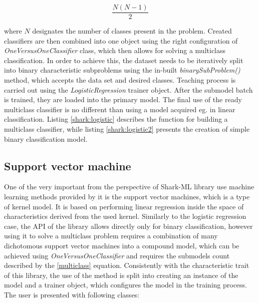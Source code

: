 \begin{equation}
	\frac{N(N-1)}{2}	
	\label{multiclass}
\end{equation}

where $N$ designates the number of classes present in the problem. Created classifiers are then combined into one object using the right configuration of \textit{OneVersusOneClassifier} class, which then allows for solving a multiclass classification. In order to achieve this, the dataset needs to be iteratively split into binary characteristic subproblems using the in-built \textit{binarySubProblem()} method, which accepts the data set and desired classes. Teaching process is carried out using the \textit{LogisticRegression} trainer object. After the submodel batch is trained, they are loaded into the primary model. The final use of the ready multiclass classifier is no different than using a model acquired eg. in linear classification. Listing \ref{shark:logistic} describes the function for building a multiclass classifier, while listing \ref{shark:logistic2} presents the creation of simple binary classification model. 

\newpage
{}


\subsection{Support vector machine}

One of the very important from the perspective of Shark-ML library use machine learning methods provided by it is the support vector machines, which is a type of kernel model. It is based on performing linear regression inside the space of characteristics derived from the used kernel. Similarly to the logistic regression case, the API of the library allows directly only for binary classification, however using it to solve a multiclass problem requires a combination of many dichotomous support vector machines into a compound model, which can be achieved using \textit{OneVersusOneClassifier} and requires the submodels count described by the \ref{multiclass} equation. Consistently with the characteristic trait of this library, the use of the method is split into creating an instance of the model and a trainer object, which configures the model in the training process. The user is presented with following classes:

